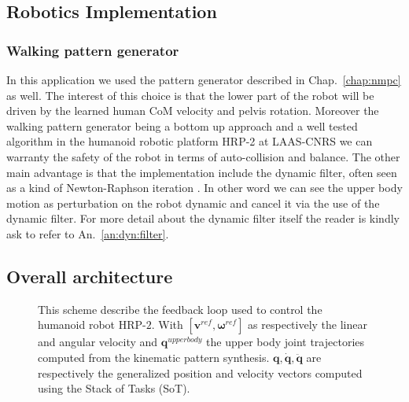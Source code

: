 \subsection{Robotics Implementation}
\label{sc:Implementation}

\subsubsection*{Walking pattern generator}

In this application we used the pattern generator described in Chap.~\ref{chap:nmpc} as well.
The interest of this choice is that the lower part of the robot will be driven by the learned human CoM velocity and pelvis rotation.
Moreover the walking pattern generator being a bottom up approach and a well tested algorithm in the humanoid robotic platform HRP-2 at LAAS-CNRS we can warranty the safety of the robot in terms of auto-collision and balance.
The other main advantage is that the implementation include the dynamic filter, often seen as a kind of Newton-Raphson iteration \cite{ref:stasse13}.
In other word we can see the upper body motion as perturbation on the robot dynamic and cancel it via the use of the dynamic filter.
For more detail about the dynamic filter itself the reader is kindly ask to refer to An.~\ref{an:dyn:filter}.

\subsection{Overall architecture}

\begin{figure} [ht]
  \centering
  
  \caption{This scheme describe the feedback loop used to control the humanoid robot HRP-$2$. With $[{\mathbf{v}}^{ref}, {\mathbf{\omega}}^{ref}]$ as respectively the linear and angular velocity and ${\mathbf{q}}^{upper body}$ the upper body joint trajectories computed from the kinematic pattern synthesis. ${\mathbf q},\dot{{\mathbf q}},\ddot{{\mathbf q}}$ are respectively the generalized position and velocity vectors computed using the Stack of Tasks (SoT).}
\label{fig:onlineWPG}
\end{figure}

